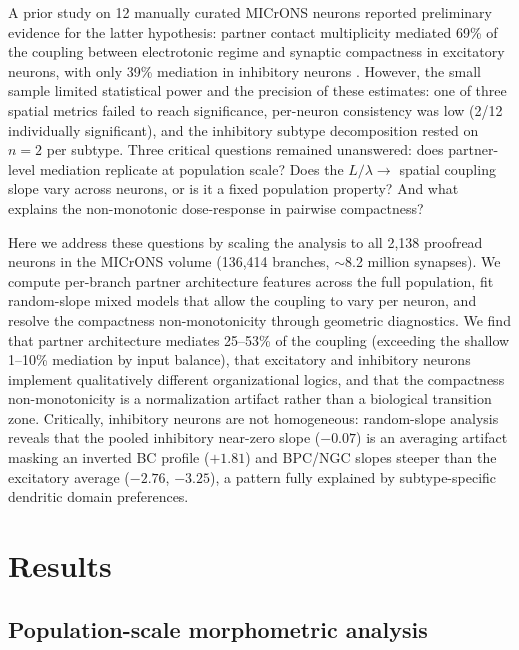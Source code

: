\documentclass[11pt]{article}
\begin{document}
A prior study on 12 manually curated MICrONS neurons reported preliminary evidence for the latter hypothesis: partner contact multiplicity mediated 69\% of the coupling between electrotonic regime and synaptic compactness in excitatory neurons, with only 39\% mediation in inhibitory neurons \citep{voruganti2026coupling}. However, the small sample limited statistical power and the precision of these estimates: one of three spatial metrics failed to reach significance, per-neuron consistency was low (2/12 individually significant), and the inhibitory subtype decomposition rested on $n = 2$ per subtype. Three critical questions remained unanswered: does partner-level mediation replicate at population scale? Does the $L/\lambda \to$ spatial coupling slope vary across neurons, or is it a fixed population property? And what explains the non-monotonic dose-response in pairwise compactness?

Here we address these questions by scaling the analysis to all 2,138 proofread neurons in the MICrONS volume (136,414 branches, $\sim$8.2 million synapses). We compute per-branch partner architecture features across the full population, fit random-slope mixed models that allow the coupling to vary per neuron, and resolve the compactness non-monotonicity through geometric diagnostics. We find that partner architecture mediates 25--53\% of the coupling (exceeding the shallow 1--10\% mediation by input balance), that excitatory and inhibitory neurons implement qualitatively different organizational logics, and that the compactness non-monotonicity is a normalization artifact rather than a biological transition zone. Critically, inhibitory neurons are not homogeneous: random-slope analysis reveals that the pooled inhibitory near-zero slope ($-0.07$) is an averaging artifact masking an inverted BC profile ($+1.81$) and BPC/NGC slopes steeper than the excitatory average ($-2.76$, $-3.25$), a pattern fully explained by subtype-specific dendritic domain preferences.


\section{Results}

\subsection{Population-scale morphometric analysis}
\label{sec:morphometry}
\end{document}
